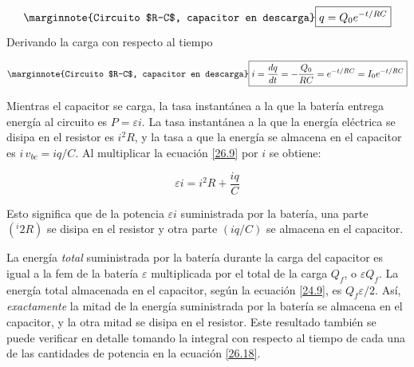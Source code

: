 \begin{equation}\label{26.16}\marginnote{Circuito $R-C$, capacitor en descarga}
\boxed{q=Q_0e^{-t/RC}}
\end{equation}
Derivando la carga con respecto al tiempo

\begin{equation}\label{26.17}\marginnote{Circuito $R-C$, capacitor en descarga}
\boxed{i=\frac{dq}{dt}=-\frac{Q_0}{RC}=e^{-t/RC}=I_0e^{-t/RC}}
\end{equation}

Mientras el capacitor se carga, la tasa instantánea a la que la batería entrega energía al circuito es $P=\varepsilon i$. La tasa instantánea a la que la energía eléctrica se disipa en el resistor es $i^2R$, y la tasa a que la energía se almacena en el capacitor es $i\, v_{bc}=iq/C$. Al multiplicar la ecuación \ref{26.9} por $i$ se obtiene:

\begin{equation}\label{26.18}
\varepsilon i=i^2R+\frac{iq}{C}
\end{equation}

Esto significa que de la potencia $\varepsilon i$ suministrada por la batería, una parte $(^i2R)$ se disipa en el resistor y otra parte $(iq/C)$ se almacena en el capacitor.

La energía \textit{total} suministrada por la batería durante la carga del capacitor es igual a la fem de la batería $\varepsilon$ multiplicada por el total de la carga $Q_f$, o $\varepsilon Q_f$. La energía total almacenada en el capacitor, según la ecuación \ref{24.9}, es $Q_f \varepsilon/2$. Así, \textit{exactamente} la mitad de la energía suministrada por la batería se almacena en el capacitor, y la otra mitad se disipa en el resistor. Este resultado también se puede verificar en detalle tomando la integral con respecto al tiempo de cada una de las cantidades de potencia en la ecuación \ref{26.18}.




































































